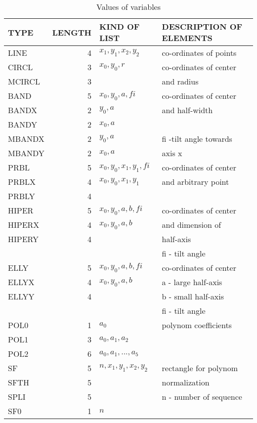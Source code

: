 {\begin{table}
  \begin{center}
  \begin{tabular}{|l|r|l|l|} \hline
 {TYPE} & {LENGTH} & {KIND OF LIST} & {DESCRIPTION OF ELEMENTS} \\ \hline
  LINE   & 4 & $x_1,y_1,x_2,y_2$    & co-ordinates of points  \\ \hline
  CIRCL  & 3 & $x_0,y_0,r$          & co-ordinates of center  \\
  MCIRCL & 3 &                      & and radius              \\ \hline
  BAND   & 5 & $x_0,y_0,a,fi$       & co-ordinates of center  \\
  BANDX  & 2 & $y_0,a$              & and half-width          \\
  BANDY  & 2 & $x_0,a$              &                         \\
  MBANDX & 2 & $y_0,a$              & fi -tilt angle towards  \\
  MBANDY & 2 & $x_0,a$              & axis x                  \\ \hline
  PRBL   & 5 & $x_0,y_0,x_1,y_1,fi$ & co-ordinates of center  \\
  PRBLX  & 4 & $x_0,y_0,x_1,y_1$    & and arbitrary point     \\
  PRBLY  & 4 &                      &                         \\ \hline
  HIPER  & 5 & $x_0,y_0,a,b,fi$     & co-ordinates of center  \\
  HIPERX & 4 & $x_0,y_0,a,b$        & and dimension of        \\
  HIPERY & 4 &                      & half-axis               \\
         &   &                      & fi - tilt angle         \\ \hline
  ELLY   & 5 & $x_0,y_0,a,b,fi$     & co-ordinates of center  \\
  ELLYX  & 4 & $x_0,y_0,a,b$        & a - large half-axis     \\
  ELLYY  & 4 &                      & b - small half-axis     \\
         &   &                      & fi - tilt angle         \\ \hline
  POL0   & 1 & $a_0$                & polynom coefficients    \\
  POL1   & 3 & $a_0,a_1,a_2$        &                         \\
  POL2   & 6 & $a_0,a_1,...,a_5$    &                         \\ \hline
  SF     & 5 & $n,x_1,y_1,x_2,y_2$  & rectangle for polynom   \\
  SFTH   & 5 &                      & normalization           \\
  SPLI   & 5 &                      & n - number of sequence  \\
  SF0    & 1 & $n$                  &                         \\ \hline
  \end{tabular}
  \end{center}
  \caption{Values of variables\label{t4}}
\end{table}}

